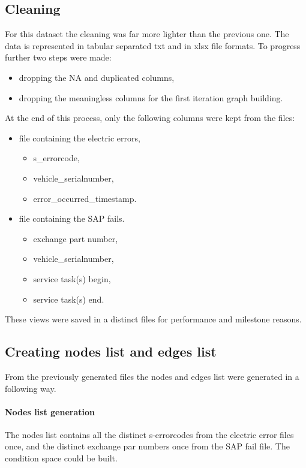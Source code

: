 	\subsection{Cleaning}
For this dataset the cleaning was far more lighter than the previous one. The data is represented in tabular separated txt and in xlsx file formats.
To progress further two steps were made:
\begin{itemize}
			\item{dropping the NA and duplicated columns,}
			\item{dropping the meaningless columns for the first iteration graph building.}
\end{itemize}

At the end of this process, only the following columns were kept from the files:
\begin{itemize}
			\item{file containing the electric errors,}
			\begin{itemize}
				\item{s\_errorcode,}
				\item{vehicle\_serialnumber,}
				\item{error\_occurred\_timestamp.}
			\end{itemize}
			\item{file containing the SAP fails.}
			\begin{itemize}
				\item{exchange part number,}
				\item{vehicle\_serialnumber,}
				\item{service task(s) begin,}
				\item{service task(s) end.}
			\end{itemize}
\end{itemize}
These views were saved in a distinct files for performance and milestone reasons.
	\subsection{Creating nodes list and edges list}
From the previously generated files the nodes and edges list were generated in a following way.
\paragraph{Nodes list generation}
The nodes list contains all the distinct s-errorcodes from the electric error files once, and the distinct exchange par numbers once from the SAP fail file. The condition space could be built.
